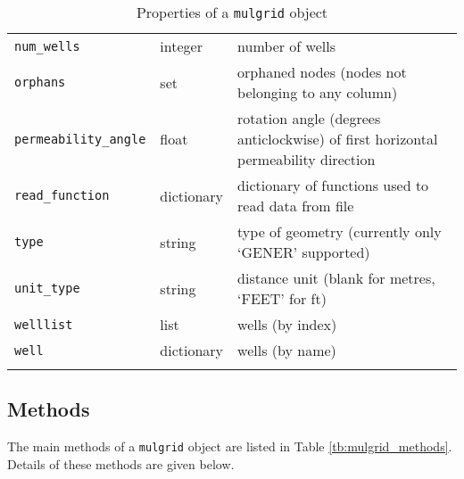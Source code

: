 \begin{center}
\begin{longtable}{|l|l|p{75mm}|}
    \texttt{num\_wells} & integer & number of wells\\
    \texttt{orphans} & set & orphaned nodes (nodes not belonging to any column)\\
    \texttt{permeability\_angle} & float & rotation angle (degrees anticlockwise) of first horizontal permeability direction \\
    \texttt{read\_function} & dictionary & dictionary of functions used to read data from file\\
    \texttt{type} & string  & type of geometry (currently only `GENER' supported)\\
    \texttt{unit\_type} & string & distance unit (blank for metres, `FEET' for ft)\\
    \texttt{welllist} & list & wells (by index)\\
    \texttt{well} & dictionary & wells (by name)\\
    \hline
    \caption{Properties of a \texttt{mulgrid} object}
    \label{tb:mulgrid_properties}
  \end{longtable}
\end{center}

\subsection{Methods}
\label{mulgridmethods}

The main methods of a \texttt{mulgrid} object are listed in Table \ref{tb:mulgrid_methods}.  Details of these methods are given below.

